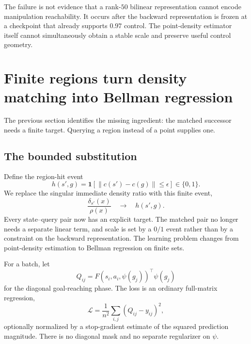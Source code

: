 \documentclass{article}
\newcommand{\ind}[1]{\mathbf{1}\!\left[#1\right]}
\newcommand{\cube}{c}
\begin{document}
\begin{finding}
The failure is not evidence that a rank-$50$ bilinear representation cannot encode
manipulation reachability. It occurs after the backward representation is frozen
at a checkpoint that already supports $0.97$ control. The point-density estimator
itself cannot simultaneously obtain a stable scale and preserve useful control
geometry.
\end{finding}

\section{Finite regions turn density matching into Bellman regression}
\label{sec:bounded}

The previous section identifies the missing ingredient: the matched successor
needs a finite target. Querying a region instead of a point supplies one.

\subsection{The bounded substitution}
\label{sec:substitution}

Define the region-hit event
\begin{equation}
\label{eq:hit}
h(s',g)
=
\ind{\|\cube(s')-\cube(g)\|\le\epsilon}
\in\{0,1\}.
\end{equation}
We replace the singular immediate density ratio with this finite event,
\begin{equation}
\label{eq:substitution}
\frac{\delta_{s'}(x)}{\rho(x)}
\quad\longrightarrow\quad
h(s',g).
\end{equation}
Every state--query pair now has an explicit target. The matched pair no longer
needs a separate linear term, and scale is set by a $0/1$ event rather than by a
constraint on the backward representation. The learning problem changes from
point-density estimation to Bellman regression on finite sets.

For a batch, let
\begin{equation}
Q_{ij}=F(s_i,a_i,\psi(g_j))^{\top}\psi(g_j)
\end{equation}
for the diagonal goal-reaching phase. The loss is an ordinary full-matrix
regression,
\begin{equation}
\label{eq:matrix-loss}
\mathcal{L}
=
\frac{1}{n^2}\sum_{i,j}
\left(Q_{ij}-y_{ij}\right)^2,
\end{equation}
optionally normalized by a stop-gradient estimate of the squared prediction
magnitude. There is no diagonal mask and no separate regularizer on $\psi$.
\end{document}

